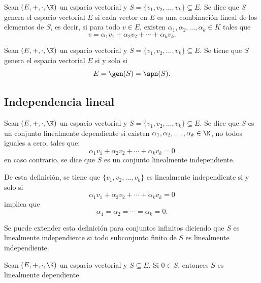 \documentclass[a4,11pt]{aleph-notas}
\begin{document}
\begin{defi}
    Sean $(E,+,\cdot,\K)$ un espacio vectorial y $S=\{v_1,v_2,\ldots,v_k\}\subseteq E$. Se dice que $S$ genera el espacio vectorial $E$ si cada vector en $E$ es una combinación lineal de los elementos de $S$, es decir, si para todo $v\in E$, existen $\alpha_1, \alpha_2, \ldots, \alpha_k\in K$ tales que
    \[
        v = \alpha_1v_1+ \alpha_2v_2+ \cdots+ \alpha_k v_k.
    \]
\end{defi}


\begin{teo}
    Sean $(E,+,\cdot,\K)$ un espacio vectorial y $S=\{v_1,v_2,\ldots,v_k\}\subseteq E$. Se tiene que $S$ genera el espacio vectorial $E$ si y solo si
    \[
        E = \gen(S) = \spn(S).
    \]
\end{teo}

\subsection{Independencia lineal}

\begin{defi}
    Sean $(E,+,\cdot,\K)$ un espacio vectorial y $S=\{v_1,v_2,\ldots,v_k\}\subseteq E$. Se dice que $S$ es un conjunto linealmente dependiente si existen $\alpha_1, \alpha_2, \ldots, \alpha_k \in \K$, no todos iguales a cero, tales que:
    \[
        \alpha_1 v_1 + \alpha_2 v_2 + \cdots + \alpha_k v_k = 0
    \]
    en caso contrario, se dice que $S$ es un conjunto linealmente independiente. 
\end{defi}

\begin{advertencia}
    De esta definición, se tiene que $\{v_1,v_2,\ldots,v_k\}$ es linealmente independiente si y solo si
    \[
        \alpha_1 v_1 + \alpha_2 v_2 + \cdots + \alpha_k v_k = 0
    \]
    implica que
    \[
        \alpha_1 = \alpha_2 = \cdots = \alpha_k = 0.
    \]
\end{advertencia}

\begin{advertencia}
    Se puede extender esta definición para conjuntos infinitos diciendo que $S$ es linealmente independiente si todo subconjunto finito de $S$ es linealmente independiente.
\end{advertencia}

\begin{teo}
    Sean $(E,+,\cdot,\K)$ un espacio vectorial y $S\subseteq E$. Si $0\in S$, entonces $S$ es linealmente dependiente.
\end{teo}
\end{document}
